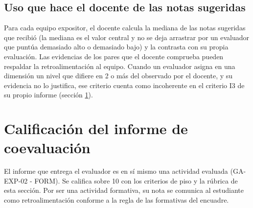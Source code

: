 \documentclass[11pt,a4paper]{article}
\begin{document}
\subsection{Uso que hace el docente de las notas sugeridas}

Para cada equipo expositor, el docente calcula la mediana de las notas sugeridas que recibió (la mediana es el valor central y no se deja arrastrar por un evaluador que puntúa demasiado alto o demasiado bajo) y la contrasta con su propia evaluación. Las evidencias de los pares que el docente comprueba pueden respaldar la retroalimentación al equipo. Cuando un evaluador asigna en una dimensión un nivel que difiere en 2 o más del observado por el docente, y su evidencia no lo justifica, ese criterio cuenta como incoherente en el criterio I3 de su propio informe (sección \ref{sec:rubricaInforme}).

\section{Calificación del informe de coevaluación}\label{sec:rubricaInforme}

El informe que entrega el evaluador es en sí mismo una actividad evaluada (GA-EXP-02 - FORM). Se califica sobre 10 con los criterios de piso y la rúbrica de esta sección. Por ser una actividad formativa, su nota se comunica al estudiante como retroalimentación conforme a la regla de las formativas del encuadre.
\end{document}
